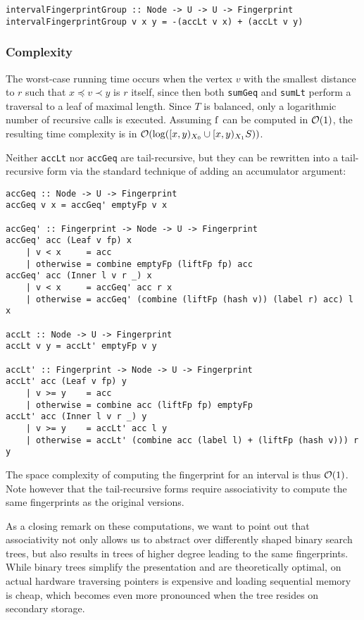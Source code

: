 \begin{verbatim}
intervalFingerprintGroup :: Node -> U -> U -> Fingerprint
intervalFingerprintGroup v x y = -(accLt v x) + (accLt v y)
\end{verbatim}

\subsubsection{Complexity}

The worst-case running time occurs when the vertex $v$ with the smallest distance to $r$ such that $x \preceq v \prec y$ is $r$ itself, since then both \texttt{sumGeq} and \texttt{sumLt} perform a traversal to a leaf of maximal length. Since $T$ is balanced, only a logarithmic number of recursive calls is executed. Assuming $\operatorname{f}$ can be computed in $\mathcal{O}(1)$, the resulting time complexity is in $\mathcal{O}(\log([{x},{y})_{X_0} \cup [{x},{y})_{X_1}{S}))$.

Neither \texttt{accLt} nor \texttt{accGeq} are tail-recursive, but they can be rewritten into a tail-recursive form via the standard technique of adding an accumulator argument:

\begin{verbatim}
accGeq :: Node -> U -> Fingerprint
accGeq v x = accGeq' emptyFp v x

accGeq' :: Fingerprint -> Node -> U -> Fingerprint
accGeq' acc (Leaf v fp) x
    | v < x     = acc
    | otherwise = combine emptyFp (liftFp fp) acc
accGeq' acc (Inner l v r _) x
    | v < x     = accGeq' acc r x
    | otherwise = accGeq' (combine (liftFp (hash v)) (label r) acc) l x

accLt :: Node -> U -> Fingerprint
accLt v y = accLt' emptyFp v y

accLt' :: Fingerprint -> Node -> U -> Fingerprint
accLt' acc (Leaf v fp) y
    | v >= y    = acc
    | otherwise = combine acc (liftFp fp) emptyFp
accLt' acc (Inner l v r _) y
    | v >= y    = accLt' acc l y
    | otherwise = accLt' (combine acc (label l) + (liftFp (hash v))) r y
\end{verbatim}

The space complexity of computing the fingerprint for an interval is thus $\mathcal{O}(1)$. Note however that the tail-recursive forms require associativity to compute the same fingerprints as the original versions.

As a closing remark on these computations, we want to point out that associativity not only allows us to abstract over differently shaped binary search trees, but also results in trees of higher degree leading to the same fingerprints. While binary trees simplify the presentation and are theoretically optimal, on actual hardware traversing pointers is expensive and loading sequential memory is cheap, which becomes even more pronounced when the tree resides on secondary storage.

